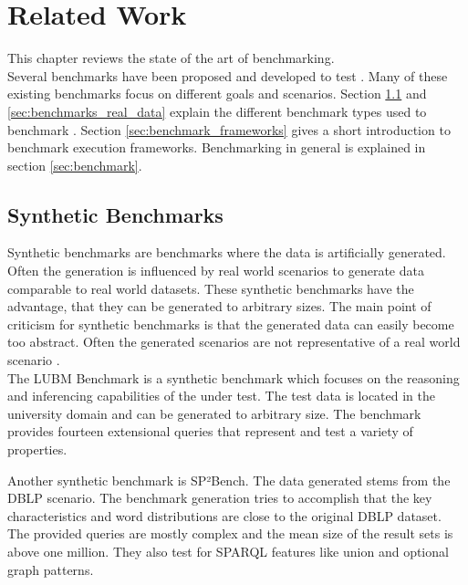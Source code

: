 \chapter{Related Work}
\label{ch:related_work}

This chapter reviews the state of the art of \ts{} benchmarking.\\

Several benchmarks have been proposed and developed to test \tsp{}.
Many of these existing benchmarks focus on different goals and scenarios.
Section \ref{sec:synthetic_benchmarks} and \ref{sec:benchmarks_real_data} explain the different benchmark types used to benchmark \tsp{}.
Section \ref{sec:benchmark_frameworks} gives a short introduction to benchmark execution frameworks.
Benchmarking in general is explained in section \ref{sec:benchmark}.

\section{Synthetic Benchmarks}
\label{sec:synthetic_benchmarks}
Synthetic benchmarks are benchmarks where the data is artificially generated.
Often the generation is influenced by real world scenarios to generate data comparable to real world datasets\cite{guoLUBMBenchmarkOWL2005}.
These synthetic benchmarks have the advantage, that they can be generated to arbitrary sizes.
The main point of criticism for synthetic benchmarks is that the generated data can easily become too abstract.
Often the generated scenarios are not representative of a real world scenario \cite{saleemFEASIBLEFeatureBasedSPARQL2015}.
\\

The LUBM Benchmark\cite{guoLUBMBenchmarkOWL2005} is a synthetic benchmark which focuses on the reasoning and inferencing capabilities of the \tsp{} under test.
The test data is located in the university domain and can be generated to arbitrary size.
The benchmark provides fourteen extensional queries that represent and test a variety of properties.

Another synthetic benchmark is SP²Bench\cite{schmidtSP2BenchSPARQLPerformance2008}.
The data generated stems from the DBLP scenario. The benchmark generation tries to accomplish that the key characteristics and word distributions are close to the original DBLP dataset.
The provided queries are mostly complex and the mean size of the result sets is above one million\cite{saleemFEASIBLEFeatureBasedSPARQL2015}.
They also test for SPARQL features like union and optional graph patterns.

